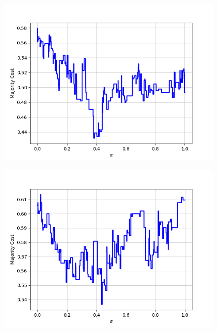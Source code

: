 \begin{figure}[H]
\begin{minipage}{.24\textwidth}
  {\includegraphics[width=\linewidth]{plots/omniglot-intra-ac-cnn/Cyrillic}}
\end{minipage}
\begin{minipage}{.24\textwidth}
  \centering
  {\includegraphics[width=\linewidth]{plots/omniglot-intra-ac-cnn/Early_Aramaic}}
\end{minipage}
\end{figure}
